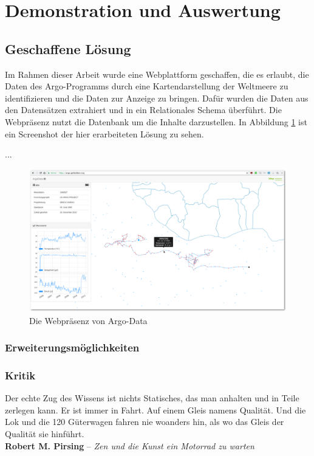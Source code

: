 \section{Demonstration und Auswertung}


\subsection{Geschaffene Lösung}

Im Rahmen dieser Arbeit wurde eine Webplattform geschaffen, die es erlaubt, die Daten des Argo-Programms durch eine Kartendarstellung der Weltmeere zu identifizieren und die Daten zur Anzeige zu bringen.
Dafür wurden die Daten aus den Datensätzen extrahiert und in ein Relationales Schema überführt. Die Webpräsenz nutzt die Datenbank um die Inhalte darzustellen. In Abbildung \ref{fig:argodataWeb} ist ein Screenshot der hier erarbeiteten Lösung zu sehen.


...

\begin{figure}[H]
 \centering
 \includegraphics[width=\textwidth]{pix/argodata_complete.png}
 \caption{Die Webpräsenz von Argo-Data}
 \label{fig:argodataWeb}
\end{figure}

\subsubsection{Erweiterungsmöglichkeiten}




\subsubsection{Kritik}






Der echte Zug des Wissens ist nichts Statisches, das man anhalten und in Teile zerlegen kann. Er ist immer in Fahrt. Auf einem Gleis namens Qualität. Und die Lok und die 120 Güterwagen fahren nie woanders hin, als wo das Gleis der Qualität sie hinführt.
\\
\hrulefill \vspace{0.3cm}
\textbf{Robert M. Pirsing} -- \textit{Zen und die Kunst ein Motorrad zu warten}


